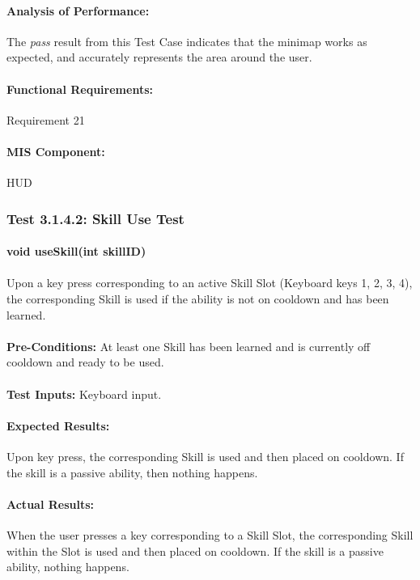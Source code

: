 \documentclass{article}
\begin{document}
    \paragraph{Analysis of Performance:} The \emph{pass} result from this Test Case indicates that the minimap works as expected, and accurately represents the area around the user.
    \paragraph{Functional Requirements:} Requirement 21
    \paragraph{MIS Component:} HUD
    
    \subsubsection{Test 3.1.4.2: Skill Use Test}
    \paragraph{}\textbf{void useSkill(int skillID)}
    \paragraph{} Upon a key press corresponding to an active Skill Slot (Keyboard keys 1, 2, 3, 4), the corresponding Skill is used if the ability is not on cooldown and has been learned.
    \paragraph{}\textbf{Pre-Conditions:} At least one Skill has been learned and is currently off cooldown and ready to be used.
    \paragraph{}\textbf{Test Inputs:} Keyboard input.
    \paragraph{Expected Results:} Upon key press, the corresponding Skill is used and then placed on cooldown. If the skill is a passive ability, then nothing happens.
    \paragraph{Actual Results:} When the user presses a key corresponding to a Skill Slot, the corresponding Skill within the Slot  is used and then placed on cooldown. If the skill is a passive ability, nothing happens. 
\end{document}
